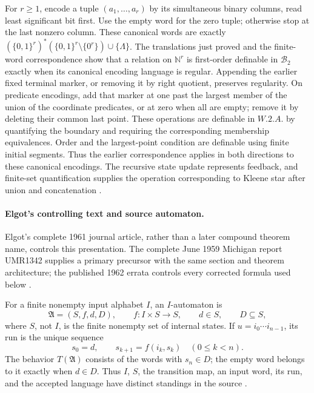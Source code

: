 For \(r\geq1\), encode a tuple \((a_1,\ldots,a_r)\) by its simultaneous
binary columns, read least significant bit first.  Use the empty word for
the zero tuple; otherwise stop at the last nonzero column.  These canonical
words are exactly
\((\{0,1\}^r)^*(\{0,1\}^r\setminus\{0^r\})\cup\{\Lambda\}\).
The translations just proved and the finite-word correspondence show that a
relation on \(\mathbb N^r\) is first-order definable in \(\mathcal B_2\)
exactly when its canonical encoding language is regular.  Appending the
earlier fixed terminal marker, or removing it by right quotient, preserves
regularity.  On predicate encodings, add that marker at one past the largest
member of the union of the coordinate predicates, or at zero when all are
empty; remove it by deleting their common last point.  These operations are
definable in \(W.2.A.\) by quantifying the boundary and requiring the
corresponding membership equivalences.  Order and the largest-point condition
are definable using finite initial segments.  Thus the earlier correspondence
applies in both directions to these canonical encodings.  The recursive state
update represents feedback, and finite-set quantification supplies the
operation corresponding to Kleene star after union and concatenation
\cite[pp.~35--36, 41--42]{Buchi1959WeakReport}.

\paragraph{Elgot's controlling text and source automaton.}
Elgot's complete 1961 journal article, rather than a later compound theorem
name, controls this presentation.  The complete June 1959 Michigan report
UMR1342 supplies a primary precursor with the same section and theorem
architecture; the published 1962 errata controls every corrected formula used
below \cite{Elgot1959Report,Elgot1961,Elgot1962Errata}.

For a finite nonempty input alphabet \(I\), an \(I\)-automaton is
\[
 \mathfrak A=(S,f,d,D),
 \qquad
 f:I\times S\longrightarrow S,
 \qquad d\in S,
 \qquad D\subseteq S,
\]
where \(S\), not \(I\), is the finite nonempty set of internal states.  If
\(u=i_0\cdots i_{n-1}\), its run is the unique sequence
\[
 s_0=d,
 \qquad
 s_{k+1}=f(i_k,s_k)\quad(0\leq k<n).
\]
The behavior \(T(\mathfrak A)\) consists of the words with \(s_n\in D\); the
empty word belongs to it exactly when \(d\in D\).  Thus \(I\), \(S\), the
transition map, an input word, its run, and the accepted language have distinct
standings in the source \cite[pp.~21--22]{Elgot1961}.

